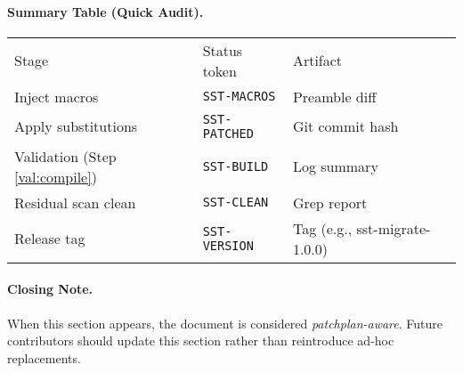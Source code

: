 \documentclass[11pt]{article}
\begin{document}
\paragraph{Summary Table (Quick Audit).}
\begin{center}\small
\begin{tabular}{lll}
Stage & Status token & Artifact \\
Inject macros & \verb|SST-MACROS| & Preamble diff \\
Apply substitutions & \verb|SST-PATCHED| & Git commit hash \\
Validation (Step \ref{val:compile}) & \verb|SST-BUILD| & Log summary \\
Residual scan clean & \verb|SST-CLEAN| & Grep report \\
Release tag & \verb|SST-VERSION| & Tag (e.g., sst-migrate-1.0.0) \\
\end{tabular}
\end{center}

\paragraph{Closing Note.} When this section appears, the document is considered \emph{patchplan-aware}. Future contributors should update this section rather than reintroduce ad-hoc replacements.

	\ifdefined\standalonechapter\else
%	
%	
\end{document}
